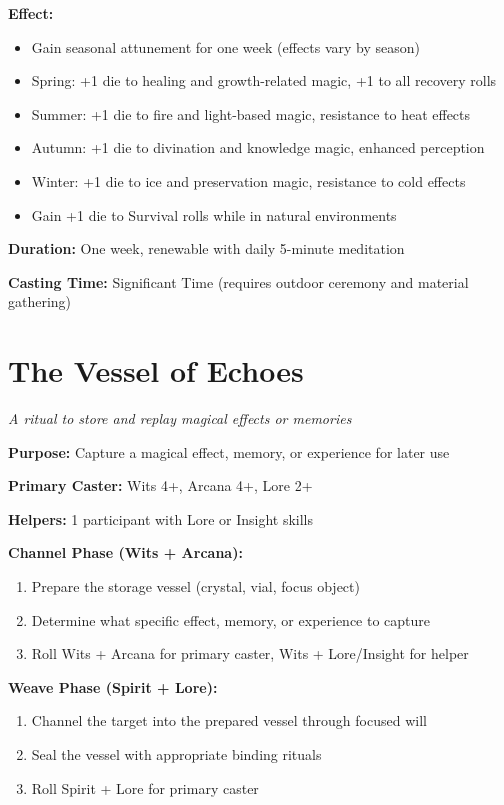 \textbf{Effect:}
\begin{itemize}
\item Gain seasonal attunement for one week (effects vary by season)
\item Spring: +1 die to healing and growth-related magic, +1 to all recovery rolls
\item Summer: +1 die to fire and light-based magic, resistance to heat effects
\item Autumn: +1 die to divination and knowledge magic, enhanced perception
\item Winter: +1 die to ice and preservation magic, resistance to cold effects
\item Gain +1 die to Survival rolls while in natural environments
\end{itemize}

\textbf{Duration:} One week, renewable with daily 5-minute meditation

\textbf{Casting Time:} Significant Time (requires outdoor ceremony and material gathering)

\section*{The Vessel of Echoes}
\textit{A ritual to store and replay magical effects or memories}

\textbf{Purpose:} Capture a magical effect, memory, or experience for later use

\textbf{Primary Caster:} Wits 4+, Arcana 4+, Lore 2+

\textbf{Helpers:} 1 participant with Lore or Insight skills

\textbf{Channel Phase (Wits + Arcana):}
\begin{enumerate}
\item Prepare the storage vessel (crystal, vial, focus object)
\item Determine what specific effect, memory, or experience to capture
\item Roll Wits + Arcana for primary caster, Wits + Lore/Insight for helper
\end{enumerate}

\textbf{Weave Phase (Spirit + Lore):}
\begin{enumerate}
\item Channel the target into the prepared vessel through focused will
\item Seal the vessel with appropriate binding rituals
\item Roll Spirit + Lore for primary caster
\end{enumerate}


